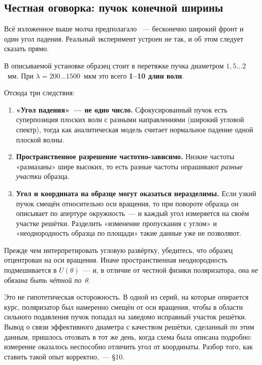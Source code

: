 \subsection{Честная оговорка: пучок конечной ширины}

Всё изложенное выше молча предполагало ~--- бесконечно широкий фронт и один
угол падения. Реальный эксперимент устроен не так, и об этом следует сказать прямо.

\begin{example}
В описываемой установке образец стоит в перетяжке пучка диаметром $1{,}5\ldots2$~мм. При
$\lambda=200\ldots1500$~мкм это всего \textbf{1--10 длин волн}.
\end{example}

\noindent
Отсюда три следствия:
\begin{enumerate}[leftmargin=1.6em,itemsep=0.35em]
  \item \textbf{«Угол падения»~--- не одно число.} Сфокусированный пучок есть суперпозиция
        плоских волн с разными направлениями (широкий угловой спектр), тогда как аналитическая
        модель считает нормальное падение одной плоской волны.
  \item \textbf{Пространственное разрешение частотно-зависимо.} Низкие частоты «размазаны» шире
        высоких, то есть разные частоты опрашивают \emph{разные участки} образца.
  \item \textbf{Угол и координата на образце могут оказаться неразделимы.} Если узкий пучок
        смещён относительно оси вращения, то при повороте образца он описывает по апертуре
        окружность~--- и каждый угол измеряется на своём участке решётки. Разделить «изменение
        пропускания с углом» и «неоднородность образца по площади» такие данные уже не
        позволяют.
\end{enumerate}

\begin{warning}
Прежде чем интерпретировать угловую развёртку, убедитесь, что образец отцентрован на оси
вращения. Иначе пространственная неоднородность подмешивается в $U(\theta)$~--- и, в отличие от
честной физики поляризатора, она \emph{не обязана быть чётной по}~$\theta$.

Это не гипотетическая осторожность. В одной из серий, на которые опирается курс, поляризатор был
намеренно смещён от оси вращения, чтобы в области сильного подавления пучок попадал на заведомо
исправный участок решётки. Вывод о связи эффективного диаметра с качеством решётки, сделанный по
этим данным, пришлось отозвать в тот же день, когда схема была описана подробно: измерение
оказалось неспособно отличить угол от координаты. Разбор того, как ставить такой опыт
корректно,~--- §10.
\end{warning}

